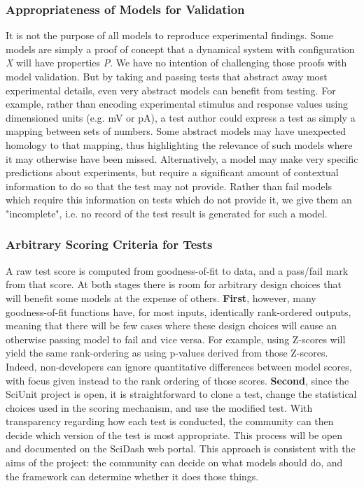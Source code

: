 \documentclass[11pt,letterpaper]{article}
\begin{document}
\subsubsection{Appropriateness of Models for Validation}
It is not the purpose of all models to reproduce experimental findings.  Some models are simply a proof of concept that a dynamical system with configuration \textit{X} will have properties \textit{P}.  We have no intention of challenging those proofs with model validation. But by taking and passing tests that abstract away most experimental details, even very abstract models can benefit from testing.  For example, rather than encoding experimental stimulus and response values using dimensioned units (e.g. mV or pA), a test author could express a test as simply a mapping between sets of numbers.  Some abstract models may have unexpected homology to that mapping, thus highlighting the relevance of such models where it may otherwise have been missed.  Alternatively, a model may make very specific predictions about experiments, but require a significant amount of contextual information to do so that the test may not provide.  Rather than fail models which require this information on tests which do not provide it, we give them an "incomplete", i.e. no record of the test result is generated for such a model.  

\subsubsection{Arbitrary Scoring Criteria for Tests}
A raw test score is computed from goodness-of-fit to data, and a pass/fail mark from that score.  At both stages there is room for arbitrary design choices that will benefit some models at the expense of others.  \textbf{First}, however, many goodness-of-fit functions have, for most inputs, identically rank-ordered outputs, meaning that there will be few cases where these design choices will cause an otherwise passing model to fail and vice versa.  For example, using Z-scores will yield the same rank-ordering as using p-values derived from those Z-scores.  Indeed, non-developers can ignore quantitative differences between model scores, with focus given instead to the rank ordering of those scores. \textbf{Second}, since the SciUnit project is open, it is straightforward to clone a test, change the statistical choices used in the scoring mechanism, and use the modified test.  With transparency regarding how each test is conducted, the community can then decide which version of the test is most appropriate.  This process will be open and documented on the SciDash web portal.  This approach is consistent with the aims of the project: the community can decide on what models should do, and the framework can determine whether it does those things. 
\end{document}
